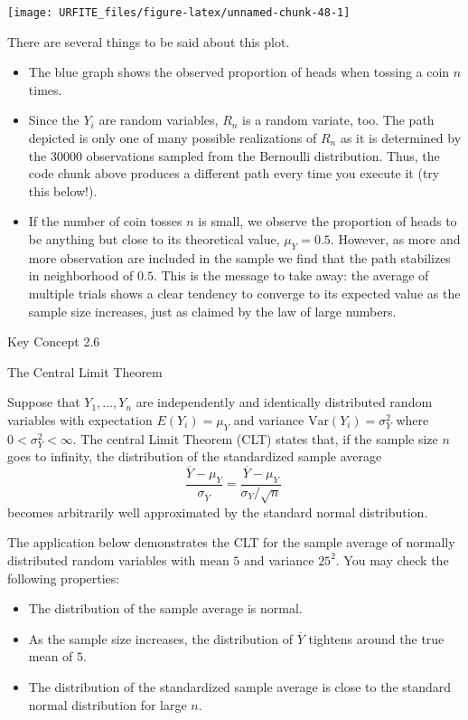 \documentclass[]{book}
\providecommand{\tightlist}{%
  \setlength{\itemsep}{0pt}\setlength{\parskip}{0pt}}
\theoremstyle{definition}
\theoremstyle{definition}
\theoremstyle{definition}
\theoremstyle{remark}
\begin{document}
\begin{center}\texttt{[image: URFITE\_files/figure-latex/unnamed-chunk-48-1]} \end{center}

There are several things to be said about this plot.

\begin{itemize}
\item
  The blue graph shows the observed proportion of heads when tossing a
  coin \(n\) times.
\item
  Since the \(Y_i\) are random variables, \(R_n\) is a random variate,
  too. The path depicted is only one of many possible realizations of
  \(R_n\) as it is determined by the \(30000\) observations sampled from
  the Bernoulli distribution. Thus, the code chunk above produces a
  different path every time you execute it (try this below!).
\item
  If the number of coin tosses \(n\) is small, we observe the proportion
  of heads to be anything but close to its theoretical value,
  \(\mu_Y = 0.5\). However, as more and more observation are included in
  the sample we find that the path stabilizes in neighborhood of
  \(0.5\). This is the message to take away: the average of multiple
  trials shows a clear tendency to converge to its expected value as the
  sample size increases, just as claimed by the law of large numbers.
\end{itemize}

Key Concept 2.6

The Central Limit Theorem

Suppose that \(Y_1,\dots,Y_n\) are independently and identically
distributed random variables with expectation \(E(Y_i)=\mu_Y\) and
variance \(\text{Var}(Y_i)=\sigma^2_Y\) where \(0<\sigma^2_Y<\infty\).
The central Limit Theorem (CLT) states that, if the sample size \(n\)
goes to infinity, the distribution of the standardized sample average
\[ \frac{\overline{Y} - \mu_Y}{\sigma_{\overline{Y}}} = \frac{\overline{Y} - \mu_Y}{\sigma_Y/\sqrt{n}} \ \]
becomes arbitrarily well approximated by the standard normal
distribution.

The application below demonstrates the CLT for the sample average of
normally distributed random variables with mean \(5\) and variance
\(25^2\). You may check the following properties:

\begin{itemize}
\tightlist
\item
  The distribution of the sample average is normal.
\item
  As the sample size increases, the distribution of \(\overline{Y}\)
  tightens around the true mean of \(5\).
\item
  The distribution of the standardized sample average is close to the
  standard normal distribution for large \(n\).
\end{itemize}
\end{document}
